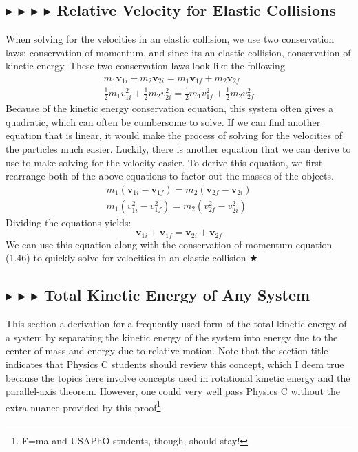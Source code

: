 %
%
\subsection{\color{OrangeRed} $\blacktriangleright$ \color{PineGreen} $\blacktriangleright$ \color{Goldenrod} $\blacktriangleright$ \color{Orchid} $\blacktriangleright$ \color{black} Relative Velocity for Elastic Collisions}
When solving for the velocities in an elastic collision, we use two conservation laws: conservation of momentum, and since its an elastic collision, conservation of kinetic energy. These two conservation laws look like the following
\begin{gather}
    m_1\mathbf{v}_{1i} + m_2\mathbf{v}_{2i} = m_1\mathbf{v}_{1f} + m_2\mathbf{v}_{2f} \\
    \frac12 m_1 v_{1i}^2 + \frac12 m_2 v_{2i}^2 = \frac12 m_1 v_{1f}^2 + \frac12 m_2 v_{2f}^2
\end{gather}
Because of the kinetic energy conservation equation, this system often gives a quadratic, which can often be cumbersome to solve. If we can find another equation that is linear, it would make the process of solving for the velocities of the particles much easier. Luckily, there is another equation that we can derive to use to make solving for the velocity easier. To derive this equation, we first rearrange both of the above equations to factor out the masses of the objects.
\begin{gather*}
    m_1(\mathbf{v}_{1i} - \mathbf{v}_{1f}) = m_2(\mathbf{v}_{2f} - \mathbf{v}_{2i}) \\
    m_1(v_{1i}^2 - v_{1f}^2) = m_2(v_{2f}^2 - v_{2i}^2)
\end{gather*}
\noindent Dividing the equations yields:
\begin{equation}
   \boxed{\mathbf{v}_{1i} + \mathbf{v}_{1f} = \mathbf{v}_{2i} + \mathbf{v}_{2f}} 
\end{equation}
\noindent We can use this equation along with the conservation of momentum equation (1.46) to quickly solve for velocities in an elastic collision $\bigstar$


%
%
\subsection{\color{PineGreen} $\blacktriangleright$ \color{Goldenrod} $\blacktriangleright$ \color{Orchid} $\blacktriangleright$ \color{black} Total Kinetic Energy of Any System} \label{1.3.5}
This section a derivation for a frequently used form of the total kinetic energy of a system by separating the kinetic energy of the system into energy due to the center of mass and energy due to relative motion. Note that the section title indicates that Physics C students should review this concept, which I deem true because the topics here involve concepts used in rotational kinetic energy and the parallel-axis theorem. However, one could very well pass Physics C without the extra nuance provided by this proof\footnote{F=ma and USAPhO students, though, should stay!}.

